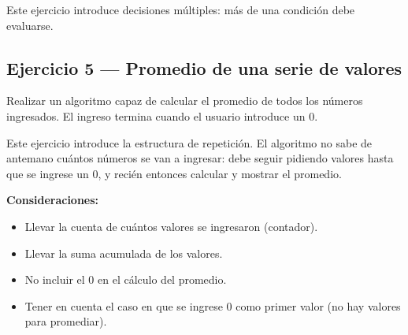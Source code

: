 \begin{advertenciabox}
Este ejercicio introduce decisiones múltiples: más de una condición debe evaluarse.
\end{advertenciabox}


\subsection{Ejercicio 5 --- Promedio de una serie de valores}

Realizar un algoritmo capaz de calcular el promedio de todos los números ingresados. El ingreso termina cuando el usuario introduce un 0.

\begin{advertenciabox}
Este ejercicio introduce la estructura de repetición. El algoritmo no sabe de antemano cuántos números se van a ingresar: debe seguir pidiendo valores hasta que se ingrese un 0, y recién entonces calcular y mostrar el promedio.
\end{advertenciabox}

\textbf{Consideraciones:}
\begin{itemize}
    \item Llevar la cuenta de cuántos valores se ingresaron (contador).
    \item Llevar la suma acumulada de los valores.
    \item No incluir el 0 en el cálculo del promedio.
    \item Tener en cuenta el caso en que se ingrese 0 como primer valor (no hay valores para promediar).
\end{itemize}

